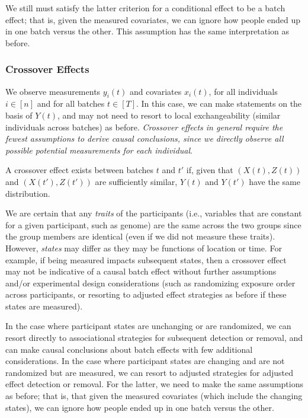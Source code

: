 {{We still must satisfy the latter criterion for a conditional effect to be a batch effect; that is, given the measured covariates, we can ignore how people ended up in one batch versus the other. This assumption has the same interpretation as before.

\subsubsection{Crossover Effects}

We observe measurements $y_i(t)$ and covariates $x_i(t)$, for all individuals $i \in [n]$ and for all batches $t \in [T]$. In this case, we can make statements on the basis of $Y(t)$, and may not need to resort to local exchangeability (similar individuals across batches) as before. \textit{Crossover effects in general require the fewest assumptions to derive causal conclusions, since we directly observe all possible potential measurements for each individual}.

\begin{flushleft}\begin{definition}
A crossover effect exists between batches $t$ and $t'$ if, given that $\left(X(t), Z(t)\right)$ and $\left(X(t'), Z(t')\right)$ are sufficiently similar, $Y(t)$ and $Y(t')$ have the same distribution.
\label{def:ass_site_effect_informal}
\end{definition}
\end{flushleft}

We are certain that any \textit{traits} of the participants (i.e., variables that are constant for a given participant, such as genome) are the same across the two groups since the group members are identical (even if we did not measure these traits). However, \textit{states} may differ as they may be functions of location or time. For example, if being measured impacts subsequent states, then a crossover effect may not be indicative of a causal batch effect without further assumptions and/or experimental design considerations (such as randomizing exposure order across participants, or resorting to adjusted effect strategies as before if these states are measured). 

In the case where participant states are unchanging or are randomized, we can resort directly to associational strategies for subsequent detection or removal, and can make causal conclusions about batch effects with few additional considerations. In the case where participant states are changing and are not randomized but are measured, we can resort to adjusted strategies for adjusted effect detection or removal. For the latter, we need to make the same assumptions as before; that is, that given the measured covariates (which include the changing states), we can ignore how people ended up in one batch versus the other.}}

